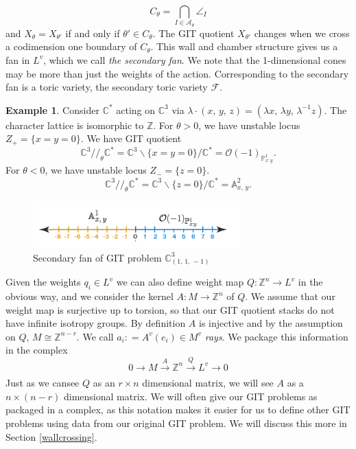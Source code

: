 \documentclass[oneside]{amsart}
\theoremstyle{definition}
\theoremstyle{definition}
\theoremstyle{definition}
\newtheorem{example}{Example} [section]
\theoremstyle{definition}
\newcommand{\defeq}{\mathrel{\mathop:}=}
\newcommand{\Z}{\mathbb{Z}}
\newcommand{\Fs}{\mathcal{F}}
\begin{document}
$$
C_\theta = \bigcap_{I \in \mathcal{A}_\theta} \angle_I
$$
and $X_\theta = X_{\theta'}$ if and only if $\theta' \in C_\theta$. The GIT quotient $X_{\theta'}$ changes when we cross a codimension one boundary of $C_{\theta}$. This wall and chamber structure gives us a fan in $L^v$, which we call \textit{the secondary fan}. We note that the 1-dimensional cones may be more than just the weights of the action. Corresponding to the secondary fan is a
toric variety, the secondary toric variety $\Fs$. 
\begin{example}
  Consider $\mathbb{C}^*$ acting on $\mathbb{C}^3$ via $\lambda \cdot (x, \, y, \, z) = (\lambda x,\, \lambda y, \, \lambda^{-1}z)$. The character lattice is isomorphic to $\mathbb{Z}$. For $\theta > 0$, we have unstable locus $Z_{+} = \{ x = y = 0 \}$. We have GIT quotient $$\mathbb{C}^3 //_{\theta} \mathbb{C}^* = \mathbb{C}^3 \backslash{\{ x = y = 0 \}} / \mathbb{C}^* = \mathcal{O}(-1)_{\mathbb{P}^1_{x:y}}.$$
   For $\theta < 0$, we have unstable locus $Z_{-} = \{z = 0\}$.
   $$\mathbb{C}^3 //_{\theta} \mathbb{C}^* = \mathbb{C}^3 \backslash{\{ z = 0 \}} / \mathbb{C}^* = \mathbb{A}^2_{x, \, y}.$$
   \begin{figure} [!h]
    \centering
    \includegraphics[width=8cm]{git/diffquotients.png}
    \caption{Secondary fan of GIT problem $\mathbb{C}^3_{(1, \, 1, \, -1 )}$}
  \end{figure}  
\end{example}
Given the weights $q_i \in L^v$ we can also define weight map $Q : \Z^n \to L^v$ in the obvious way, and we consider the kernel $A : M \to \Z^n$ of $Q$. We assume that our weight map is surjective up to torsion, so that our GIT quotient stacks do not have infinite isotropy groups. By definition $A$ is injective and by the assumption on $Q$, $M \cong \Z^{n-r}$. We call $a_i \defeq A^v(e_i) \in M^v $ \textit{rays}. We package this information in the complex
$$
0 \xrightarrow[]{} M \xrightarrow[]{A} \Z^n \xrightarrow[]{Q} L^v \xrightarrow[]{} 0
$$
Just as we cansee $Q$ as an $r\times n$ dimensional matrix, we will see $A$ as a $n \times (n-r)$ dimensional matrix.  We will often give our GIT problems as packaged in a complex, as this notation makes it easier for us to define other GIT problems using data from our original GIT problem. We will discuss this more in Section \ref{wallcrossing}.
\end{document}
